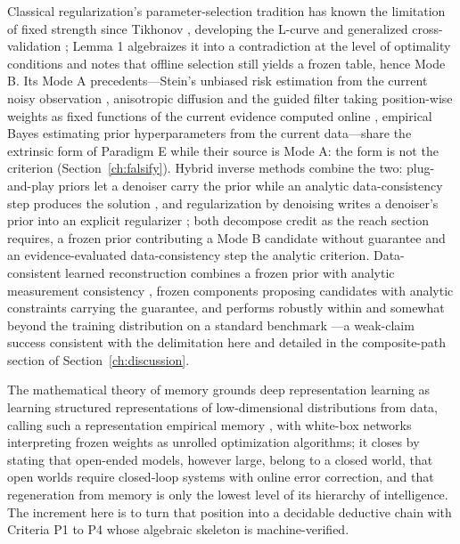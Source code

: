 Classical regularization's parameter-selection tradition has known the limitation of fixed strength since Tikhonov \citep{tikhonov1977}, developing the L-curve \citep{hansen1992} and generalized cross-validation \citep{golub1979}; Lemma 1 algebraizes it into a contradiction at the level of optimality conditions and notes that offline selection still yields a frozen table, hence Mode B. Its Mode A precedents---Stein's unbiased risk estimation from the current noisy observation \citep{stein1981}, anisotropic diffusion and the guided filter taking position-wise weights as fixed functions of the current evidence computed online \citep{perona1990,he2013}, empirical Bayes estimating prior hyperparameters from the current data---share the extrinsic form of Paradigm E while their source is Mode A: the form is not the criterion (Section~\ref{ch:falsify}). Hybrid inverse methods combine the two: plug-and-play priors let a denoiser carry the prior while an analytic data-consistency step produces the solution \citep{venkatakrishnan2013}, and regularization by denoising writes a denoiser's prior into an explicit regularizer \citep{romano2017}; both decompose credit as the reach section requires, a frozen prior contributing a Mode B candidate without guarantee and an evidence-evaluated data-consistency step the analytic criterion. Data-consistent learned reconstruction combines a frozen prior with analytic measurement consistency \citep{haltmeier2026}, frozen components proposing candidates with analytic constraints carrying the guarantee, and performs robustly within and somewhat beyond the training distribution on a standard benchmark \citep{leuschner2021}---a weak-claim success consistent with the delimitation here and detailed in the composite-path section of Section~\ref{ch:discussion}.

The mathematical theory of memory grounds deep representation learning as learning structured representations of low-dimensional distributions from data, calling such a representation empirical memory \citep{buchanan2026}, with white-box networks interpreting frozen weights as unrolled optimization algorithms; it closes by stating that open-ended models, however large, belong to a closed world, that open worlds require closed-loop systems with online error correction, and that regeneration from memory is only the lowest level of its hierarchy of intelligence. The increment here is to turn that position into a decidable deductive chain with Criteria P1 to P4 whose algebraic skeleton is machine-verified.
